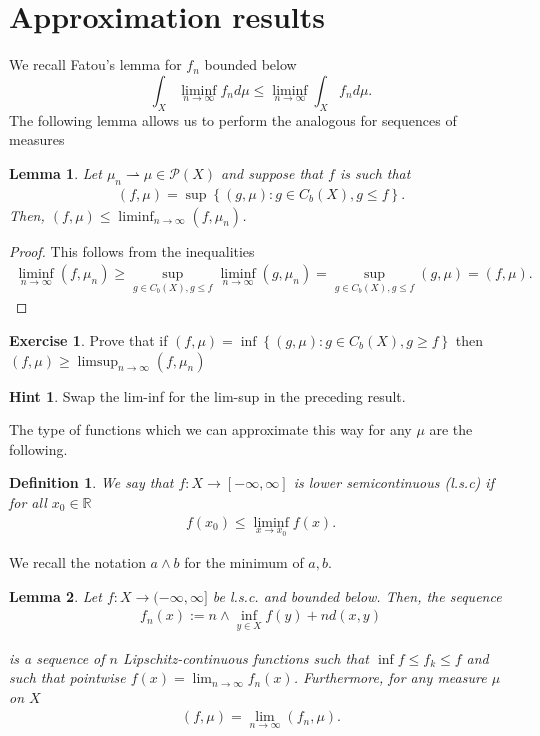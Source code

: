 \documentclass[
    a4paper,
    DIV=14,
    abstract=true,
    numbers=noenddot
]
{scrartcl}
\newtheorem{lemma}[lemma]{Lemma}
\newtheorem{definition}[definition]{Definition}
\theoremstyle{definition}
\newtheorem{exercise}{Exercise}
\newtheorem*{hint}{Hint}
\newcommand{\set}[1]{\left\{#1\right\}}
\newcommand{\R}{\mathbb{R}}
\newcommand{\Pp}{\mathcal{P}}
\begin{document}
\section{Approximation results}
We recall Fatou's lemma for $f_n$ bounded below
\begin{equation*}
    \int_{X} \liminf_{n\to\infty} f_n d\mu \le \liminf_{n\to\infty} \int_{X} f_n d\mu.
\end{equation*}
The following lemma allows us to perform the analogous for sequences of measures
\begin{lemma}\label{Fatou measures}
    Let $\mu_n\rightharpoonup\mu \in \Pp (X) $ and suppose that $f$ is such that
    \begin{align*}
        (f,\mu )= \sup\set{(g,\mu): g \in C_b(X), g \leq f}.
    \end{align*}
    Then, $ (f,\mu )\leq\liminf_{n \to \infty} (f,\mu_n)  $.
\end{lemma}
\begin{proof}
    This follows from the inequalities
    \begin{align*}
        \liminf_{n \to \infty} (f,\mu_n) \geq \sup_{g \in C_b(X), g \leq f} \liminf_{n \to \infty}(g,\mu _n)=\sup_{g \in C_b(X), g \leq f} (g,\mu)= (f,\mu ).
    \end{align*}
\end{proof}
\begin{exercise}
    Prove that if $  (f,\mu )= \inf\set{(g,\mu): g \in C_b(X), g \geq f}$ then  $ (f,\mu )\geq\limsup_{n \to \infty} (f,\mu_n)  $
\end{exercise}
\begin{hint}
    Swap the lim-inf for the lim-sup in the preceding result.
\end{hint}
The type of functions which we can approximate this way for any $\mu $ are the following.
\begin{definition}
    We say that $f:X \to [-\infty,\infty]$ is lower semicontinuous (l.s.c) if for all $x_0 \in \R$
    \begin{align*}
        f(x_0)\leq\liminf_{x \to x_0}f(x).
    \end{align*}
\end{definition}
We recall the notation $a\wedge b$ for the minimum of $a,b$.
\begin{lemma}\label{lsc approx lemma}
    Let $f:X \to (- \infty,\infty]$ be l.s.c. and bounded below. Then, the sequence
    \begin{align*}
        f_n(x):= n\wedge\inf_{ y \in X}f(y)+nd(x,y)
    \end{align*}


    is a sequence of $n$ Lipschitz-continuous functions such that $\inf f \leq f_k \leq f$ and such that  pointwise $f(x)= \lim_{n \to \infty}f_n(x)$. Furthermore, for any measure $\mu $ on $X$
    \begin{align*}
        (f,\mu)= \lim_{n \to \infty} (f_n,\mu).
    \end{align*}
\end{lemma}
\end{document}
